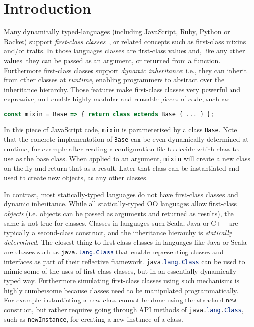 \section{Introduction}
\label{sec:intro}

Many dynamically typed-languages (including JavaScript, Ruby, Python
or Racket) support \emph{first-class classes}~\citep{DBLP:conf/aplas/FlattFF06}, or related concepts
such as first-class mixins and/or traits. In those languages classes
are first-class values and, like any other values, they can be
passed as an argument, or returned from a function. Furthermore
first-class classes support \emph{dynamic inheritance}: i.e., they
can inherit from other classes at \emph{runtime}, enabling
programmers to abstract over the inheritance hierarchy. 
Those features make first-class classes very powerful and expressive,
and enable highly modular and reusable pieces of code, such as:
\begin{lstlisting}[language=JavaScript]
const mixin = Base => { return class extends Base { ... } };
\end{lstlisting}
In this piece of JavaScript code, \lstinline{mixin} is
parameterized by a class \lstinline{Base}. Note that the concrete
implementation of \lstinline{Base} can be 
even dynamically determined at runtime, for example 
after reading a configuration file to decide which 
class to use as the base class.  When applied to an argument, 
\lstinline{mixin} will create a new class on-the-fly and return that
as a result. Later that class can be instantiated and used to create 
new objects, as any other classes.

In contrast, most statically-typed
languages do not have first-class classes and dynamic
inheritance. While all statically-typed OO languages allow first-class
\emph{objects} (i.e. objects can be passed as arguments and returned
as results), the same is not true for classes. Classes in languages such
Scala, Java or C++ are typically a second-class construct, and the
inheritance hierarchy is \emph{statically determined}. The closest thing
to first-class classes in 
languages like Java or Scala are classes such as 
\lstinline[language=java]{java.lang.Class} that enable representing classes and
interfaces as part of their reflective framework. \lstinline[language=java]{java.lang.Class} can be used to
mimic some of the uses of first-class classes, but in an essentially
dynamically-typed way. Furthermore simulating first-class classes
using such mechanisms is highly cumbersome because classes need to be
manipulated programmatically. For example instantiating a new class
cannot be done using the standard \lstinline{new} construct, but
rather requires going through API methods of
\lstinline[language=java]{java.lang.Class}, such as \lstinline{newInstance}, for
creating a new instance of a class.

